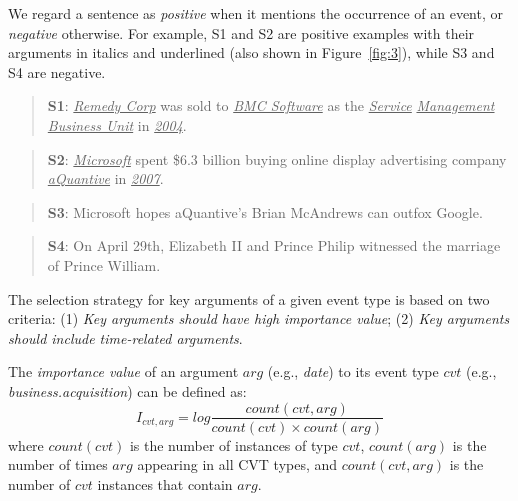 We regard a sentence as \emph{positive} when it mentions the occurrence of an event, or  \emph{negative} otherwise.
For example, S1 and S2 are positive examples with their arguments in italics and underlined (also shown in Figure~\ref{fig:3}), while S3 and S4 are negative.
%
\begin{quote}
	\textbf{S1}: \underline{\emph{Remedy Corp}} was sold to \underline{\emph{BMC Software}} as the \underline{\emph{Service}} \underline{\emph{Management Business Unit}} in \underline{\emph{2004}}.
\end{quote}
\begin{quote}
\textbf{S2}: \underline{\emph{Microsoft}} spent \$6.3 billion buying online display advertising company \underline{\emph{aQuantive}} in \underline{\emph{2007}}.
\end{quote}
\begin{quote}
\textbf{S3}: Microsoft hopes aQuantive's Brian McAndrews can outfox Google.
\end{quote}
\begin{quote}
\textbf{S4}: On April 29th, Elizabeth II and Prince Philip witnessed the marriage of Prince William.
\end{quote}

The selection strategy for key arguments of a given event type is based on two criteria: (1) \emph{Key arguments should have high importance value}; (2) \emph{Key arguments should include time-related arguments}.


The \emph{importance value} of an argument $arg$ (e.g., \emph{date}) to its event type $cvt$ (e.g., \emph{business.acquisition}) can be defined as:
\begin{equation}
	I_{cvt, arg} = log \frac{count(cvt, arg)}{count(cvt) \times count(arg)}
\end{equation}
where $count(cvt)$ is the number of instances of type $cvt$, $count(arg)$ is the number of times $arg$ appearing in all CVT types, and $count(cvt, arg)$ is the number of $cvt$ instances that contain $arg$.

